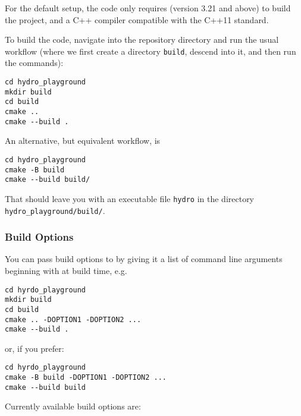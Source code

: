 For the default setup, the code only requires \cmake (version 3.21 and
above) to build the project, and a C++ compiler compatible with the C++11
standard.

To build the code, navigate into the repository directory and run the usual
\cmake workflow (where we first create a directory \verb|build|, descend
into it, and then run the \cmake commands):

\begin{lstlisting}
cd hydro_playground
mkdir build
cd build
cmake ..
cmake --build .
\end{lstlisting}

An alternative, but equivalent workflow, is

\begin{lstlisting}
cd hydro_playground
cmake -B build
cmake --build build/
\end{lstlisting}


That should leave you with an executable file \verb|hydro| in the directory
\verb|hydro_playground/build/|.







\subsubsection{Build Options}


You can pass build options to \cmake by giving it a list of command line
arguments beginning with  at build time, e.g.

\begin{lstlisting}
cd hyrdo_playground
mkdir build
cd build
cmake .. -DOPTION1 -DOPTION2 ...
cmake --build .
\end{lstlisting}

or, if you prefer:

\begin{lstlisting}
cd hyrdo_playground
cmake -B build -DOPTION1 -DOPTION2 ...
cmake --build build
\end{lstlisting}


Currently available build options are:


